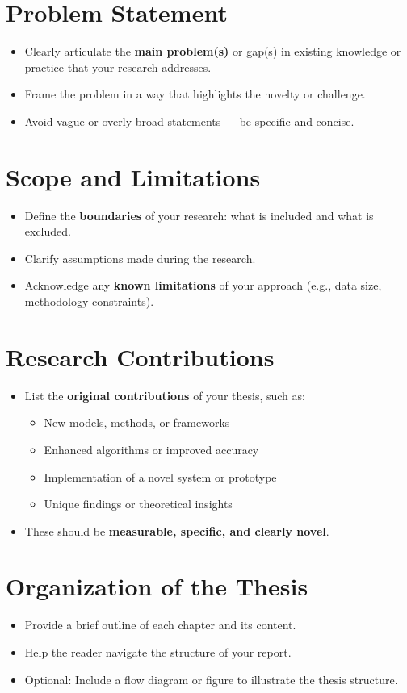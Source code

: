 \section{Problem Statement}
\begin{itemize}
    \item Clearly articulate the \textbf{main problem(s)} or gap(s) in existing knowledge or practice that your research addresses.
    \item Frame the problem in a way that highlights the novelty or challenge.
    \item Avoid vague or overly broad statements — be specific and concise.
\end{itemize}

\section{Scope and Limitations}
\begin{itemize}
    \item Define the \textbf{boundaries} of your research: what is included and what is excluded.
    \item Clarify assumptions made during the research.
    \item Acknowledge any \textbf{known limitations} of your approach (e.g., data size, methodology constraints).
\end{itemize}

\section{Research Contributions}
\begin{itemize}
    \item List the \textbf{original contributions} of your thesis, such as:
    \begin{itemize}
        \item New models, methods, or frameworks
        \item Enhanced algorithms or improved accuracy
        \item Implementation of a novel system or prototype
        \item Unique findings or theoretical insights
    \end{itemize}
    \item These should be \textbf{measurable, specific, and clearly novel}.
\end{itemize}

\section{Organization of the Thesis}
\begin{itemize}
    \item Provide a brief outline of each chapter and its content.
    \item Help the reader navigate the structure of your report.
    \item Optional: Include a flow diagram or figure to illustrate the thesis structure.
\end{itemize}

